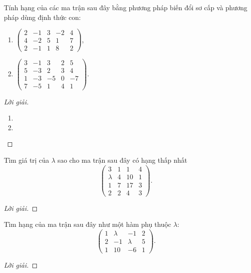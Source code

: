 \documentclass[class=linearalgebra,crop=false]{standalone}
\begin{document}
\begin{exercise}
    \par Tính hạng của các ma trận sau đây bằng phương pháp biến đổi sơ cấp và phương pháp dùng định thức con:
    \begin{enumerate}[label = (\alph*)]
        \item $
                  \begin{pmatrix}
                      2 & -1 & 3 & -2 & 4 \\
                      4 & -2 & 5 & 1  & 7 \\
                      2 & -1 & 1 & 8  & 2
                  \end{pmatrix}
              $,
        \item $
                  \begin{pmatrix}
                      3 & -1 & 3  & 2 & 5  \\
                      5 & -3 & 2  & 3 & 4  \\
                      1 & -3 & -5 & 0 & -7 \\
                      7 & -5 & 1  & 4 & 1
                  \end{pmatrix}
              $.
    \end{enumerate}
\end{exercise}

\begin{proof}[Lời giải]
    \begin{enumerate}[label = (\alph*)]
        \item
        \item
    \end{enumerate}
\end{proof}

\begin{exercise}
    \par Tìm giá trị của $\lambda$ sao cho ma trận sau đây có hạng thấp nhất
    \[
        \begin{pmatrix}
            3       & 1 & 1  & 4 \\
            \lambda & 4 & 10 & 1 \\
            1       & 7 & 17 & 3 \\
            2       & 2 & 4  & 3
        \end{pmatrix}.
    \]
\end{exercise}

\begin{proof}[Lời giải]
\end{proof}

\begin{exercise}
    \par Tìm hạng của ma trận sau đây như một hàm phụ thuộc $\lambda$:
    \[
        \begin{pmatrix}
            1 & \lambda & -1      & 2 \\
            2 & -1      & \lambda & 5 \\
            1 & 10      & -6      & 1
        \end{pmatrix}.
    \]
\end{exercise}

\begin{proof}[Lời giải]
\end{proof}
\end{document}
